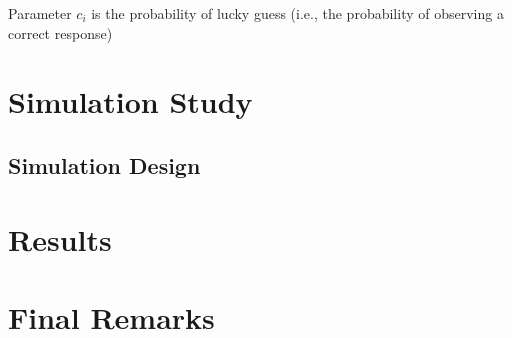 \documentclass[12pt, a4paper, titilepage]{article}
\begin{document}
Parameter $c_i$ is the probability of lucky guess (i.e., the probability of observing a correct response)


\section{Simulation Study}

\subsection{Simulation Design}

\section{Results}

\section{Final Remarks}
\end{document}
